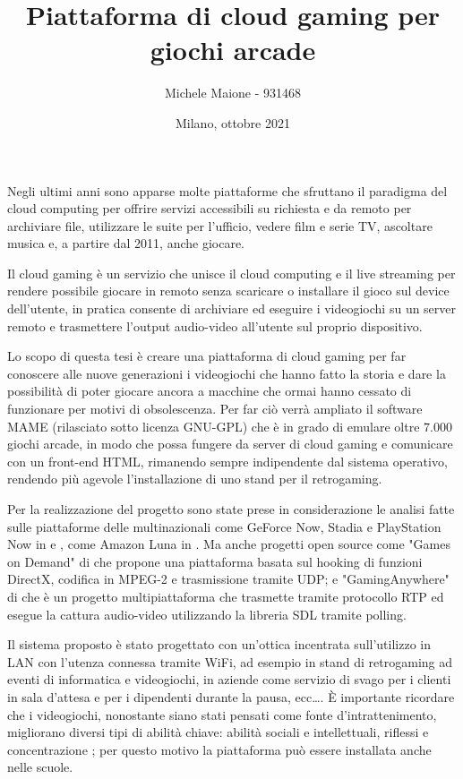 \documentclass{article} %
\title{Piattaforma di cloud gaming per giochi arcade}
\author{Michele Maione - 931468}
\date{Milano, ottobre 2021}
\begin{document}
\maketitle
{}

Negli ultimi anni sono apparse molte piattaforme che sfruttano il paradigma del cloud computing per offrire servizi accessibili su richiesta e da remoto per archiviare file, utilizzare le suite per l'ufficio, vedere film e serie TV, ascoltare musica e, a partire dal 2011, anche giocare.

Il cloud gaming è un servizio che unisce il cloud computing e il live streaming per rendere possibile giocare in remoto senza scaricare o installare il gioco sul device dell'utente, in pratica consente di archiviare ed eseguire i videogiochi su un server remoto e trasmettere l'output audio-video all'utente sul proprio dispositivo.

Lo scopo di questa tesi è creare una piattaforma di cloud gaming per far conoscere alle nuove generazioni i videogiochi che hanno fatto la storia e dare la possibilità di poter giocare ancora a macchine che ormai hanno cessato di funzionare per motivi di obsolescenza. Per far ciò verrà ampliato il software MAME (rilasciato sotto licenza GNU-GPL) che è in grado di emulare oltre $7.000$ giochi arcade, in modo che possa fungere da server di cloud gaming e comunicare con un front-end HTML, rimanendo sempre indipendente dal sistema operativo, rendendo più agevole l'installazione di uno stand per il retrogaming. 

Per la realizzazione del progetto sono state prese in considerazione le analisi fatte sulle piattaforme delle multinazionali come GeForce Now, Stadia e PlayStation Now in \parencite{A_Network_Analysis_on_Cloud_Gaming_Stadia_GeForce_Now_and_PSNow} e \parencite{Network_Analysis_of_the_Sony_Remote_Play_System}, come Amazon Luna in \parencite{Amazon_Luna_WebRTC}. Ma anche progetti open source come "Games on Demand" di \parencite{ARealTimeStreamingGamesonDemandSystem} che propone una piattaforma basata sul hooking di funzioni DirectX, codifica in MPEG-2 e trasmissione tramite UDP; e "GamingAnywhere" di \parencite{GamingAnywhere} che è un progetto multipiattaforma che trasmette tramite protocollo RTP ed esegue la cattura audio-video utilizzando la libreria SDL tramite polling.

Il sistema proposto è stato progettato con un'ottica incentrata sull'utilizzo in LAN con l'utenza connessa tramite WiFi, ad esempio in stand di retrogaming ad eventi di informatica e videogiochi, in aziende come servizio di svago per i clienti in sala d'attesa e per i dipendenti durante la pausa, ecc\dots. È importante ricordare che i videogiochi, nonostante siano stati pensati come fonte d'intrattenimento, migliorano diversi tipi di abilità chiave: abilità sociali e intellettuali, riflessi e concentrazione \parencite{Use_of_Cloud_Gaming_in_Education}; per questo motivo la piattaforma può essere installata anche nelle scuole.
\end{document}
